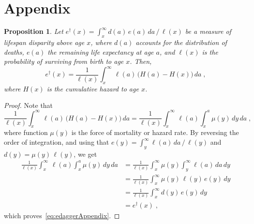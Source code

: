 \documentclass[a4paper,twoside, openright, 12pt, leqno]{article}
\newtheorem{theorem}{Proposition}
\begin{document}
% 



\linespread{1}\normalsize






\newpage

\section*{Appendix}

\setcounter{equation}{0}
\renewcommand{\theequation}{A\arabic{equation}}

\begin{theorem}
 Let $e^\dagger(x)=\int_x^\infty d(a)\,e(a)\,da\,/\,\ell(x)$ be a measure of lifespan disparity above age $x$, where $d(a)$ accounts for the distribution of deaths, $e(a)$ the remaining life expectancy at age $a$, and $\ell(x)$ is the probability of surviving from birth to age $x$. Then,
 \begin{equation}
  e^\dagger(x)=\frac{1}{\ell(x)}\int_x^\infty\,\ell(a)\,\big(H(a)-H(x)\big)\,da\;,
  \label{eq:edaggerAppendix}
 \end{equation}
 where $H(x)$ is the cumulative hazard to age $x$.
 \label{prop1}
\end{theorem}

\begin{proof}
  Note that
  $$
  \frac{1}{\ell(x)}\int_x^\infty\,\ell(a)\,\big(H(a)-H(x)\big)\,da=\frac{1}{\ell(x)}\int_x^\infty\,\ell(a)\int_x^a\mu(y)\,dy\,da\;,
  $$
  where function $\mu(y)$ is the force of mortality or hazard rate. By reversing the order of integration, and using that $e(y)=\int_y^\infty\ell(a)\,da\,/\,\ell(y)$ and $d(y)=\mu(y)\,\ell(y)$, we get
  \begin{equation*}
    \begin{split}
      \frac{1}{\ell(x)}\int_x^\infty\,\ell(a)\int_x^a\mu(y)\,dy\,da
	  & = \frac{1}{\ell(x)}\int_x^\infty\mu(y)\int_y^\infty\ell(a)\,da\,dy			\\
	  & = \frac{1}{\ell(x)}\int_x^\infty\mu(y)\,\ell(y)\,e(y)\,dy				\\			
	  & = \frac{1}{\ell(x)}\int_x^\infty d(y)\,e(y)\,dy				\\
	  & = e^\dagger(x)\;,
    \end{split}  
  \end{equation*}
  which proves~\eqref{eq:edaggerAppendix}.
\end{proof}
\medskip
\end{document}
